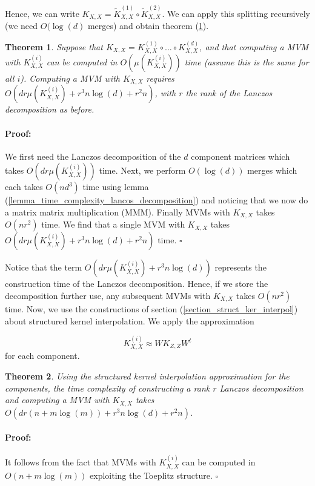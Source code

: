 \documentclass[12pt,a4paper,oneside]{book}
\newtheorem{Theorem}{Theorem}
\newenvironment{proof}{\paragraph{Proof:}}{\hfill$\square$}
\begin{document}
Hence, we can write $ K_{X,X} = \tilde{K}_{X,X}^{(1)} \circ \tilde{K}_{X,X}^{(2)}$. We can apply this splitting recursively (we need $O(\log(d)$ merges) and obtain theorem  (\ref{theorem_multi_prod}).

\begin{Theorem}\label{theorem_multi_prod}
Suppose that $ K_{X,X} = K_{X,X}^{(1)} \circ \ldots \circ K_{X,X}^{(d)}$, and that computing a MVM with $K_{X,X}^{(i)}$ can be computed in $O(\mu(K_{X,X}^{(i)}))$ time (assume this is the same for all $i$). Computing a MVM with $K_{X,X}$ requires $O(dr \mu(K_{X,X}^{(i)}) +r^{3} n \log{(d)} + r^2n)$, with $r$ the rank of the Lanczos decomposition as before.
\end{Theorem}

\begin{proof}
We first need the Lanczos decomposition of the $d$ component matrices which takes $O\left(dr\mu(K_{X,X}^{(i)}) \right)$ time. Next, we perform  $O(\log{(d)})$ merges which each takes $O(n d^3)$ time using lemma (\ref{lemma_time_complexity_lancos_decomposition}) and noticing that we now do a matrix matrix multiplication (MMM).  Finally MVMs with $ K_{X,X}$ takes $O(n r^2)$ time. We find that a single MVM with $K_{X,X}$ takes $O(dr \mu(K_{X,X}^{(i)}) +r^{3} n \log{(d)} + r^2n)$ time. 
\end{proof}

Notice that the term $O(dr \mu(K_{X,X}^{(i)}) +r^{3} n \log{(d)})$ represents the construction time of the Lanczos decomposition. Hence, if we store the decomposition further use, any subsequent MVMs with $ K_{X,X}$ takes $O(n r^2)$ time. Now, we use the constructions of section (\ref{section_struct_ker_interpol}) about structured kernel interpolation. We apply the approximation 

\begin{equation}
K_{X,X}^{(i)} \approx W K_{Z,Z} W^t 
\end{equation}
for each component.

\begin{Theorem}
Using the structured kernel interpolation approximation for the components, the time complexity of constructing a rank $r$ Lanczos decomposition and computing a MVM with $ K_{X,X}$ takes 
$O(dr (n + m \log{(m)}) +r^{3} n \log{(d)} + r^2n)$.
\end{Theorem}

\begin{proof}
It follows from the fact that MVMs with $K_{X,X}^{(i)}$ can be computed in $O(n + m \log{(m)})$ exploiting the Toeplitz structure.  
\end{proof}
\end{document}
